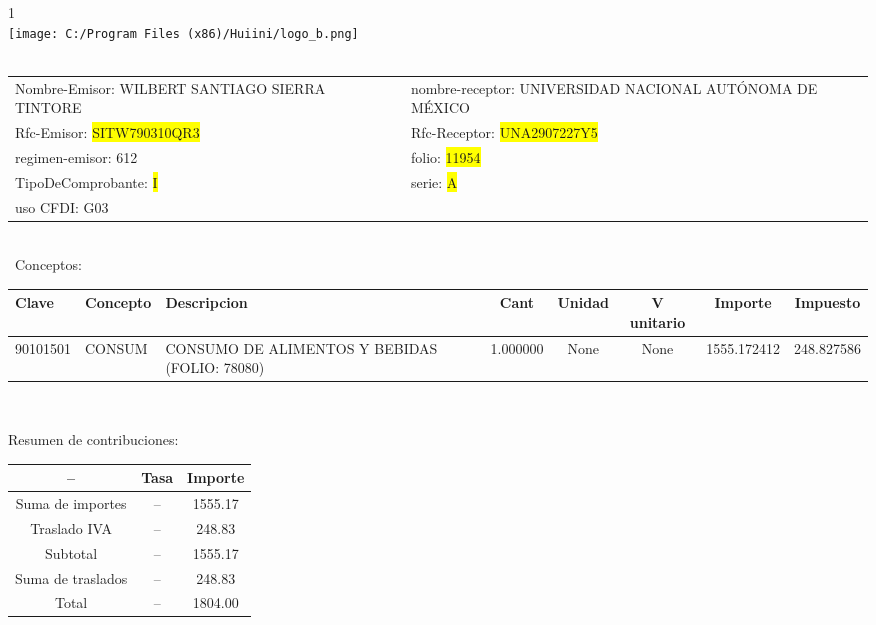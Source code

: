 \documentclass{article}
\begin{document}
\hspace{18cm} 1\\
\texttt{[image: C:/Program Files (x86)/Huiini/logo\_b.png]}
\bigskip\\\
\begin{tabular}{p{11cm}p{1cm}p{8cm}}

Nombre-Emisor: WILBERT SANTIAGO SIERRA TINTORE && nombre-receptor: UNIVERSIDAD NACIONAL AUTÓNOMA DE MÉXICO\\

Rfc-Emisor: \colorbox{yellow}{ SITW790310QR3 } & & Rfc-Receptor: \colorbox{yellow}{ UNA2907227Y5 }\\

regimen-emisor: 612 & & folio: \colorbox{yellow}{ 11954 }\\

TipoDeComprobante: \colorbox{yellow}{ I } & & serie: \colorbox{yellow}{ A }\\

uso CFDI: G03\\



\end{tabular}
\bigskip\bigskip\bigskip\\\
Conceptos:\\
\begin{tabular}{|p{1.5cm}|p{3.6cm}|p{3.6cm}|c|c|c|c|c|}
\hline
Clave & Concepto & Descripcion & Cant & Unidad & V unitario & Importe & Impuesto \\
\hline

90101501 & CONSUM & CONSUMO DE ALIMENTOS Y BEBIDAS (FOLIO: 78080) & 1.000000 & None & None & 1555.172412 &  248.827586 \\
\hline

\end{tabular}\\
\bigskip
\begin{center}
Resumen de contribuciones:\\
\bigskip
\begin{tabular}{|c|c|c|}
\hline
 -- & Tasa & Importe\\
\hline

Suma de importes & -- & 1555.17 \\
\hline

Traslado IVA & -- & 248.83 \\
\hline

Subtotal  & -- & 1555.17 \\
\hline

Suma de traslados & -- & 248.83 \\
\hline

Total  & -- & 1804.00 \\
\hline

\end{tabular}
\end{center}
\end{document}
